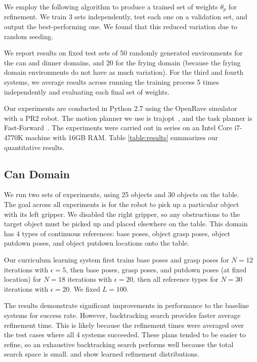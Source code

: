 We employ the following algorithm to produce a trained set of weights $\theta_{p}$ for refinement. We train 3 sets independently,
test each one on a validation set, and output the best-performing one. We found that this
reduced variation due to random seeding.

We report results on fixed test sets of 50 randomly generated environments for the can and dinner domains,
and 20 for the frying domain (because the frying domain environments do not have as much variation).
For the third and fourth systems, we average results across running the training
process 5 times independently and evaluating each final set of weights.

Our experiments are conducted in Python 2.7 using the OpenRave simulator~\cite{Diankov_2008_6117} with a PR2 robot.
The motion planner we use is trajopt~\cite{schulman2013finding}, and the task planner is Fast-Forward~\cite{FF}.
The experiments were carried out in series on an Intel Core i7-4770K machine with 16GB RAM.
Table \ref{table:results} summarizes our quantitative results.

\subsection{Can Domain}
We run two sets of experiments, using 25 objects and 30 objects on the table.
The goal across all experiments is for the robot to pick up a particular object with its
left gripper. We disabled the right gripper, so any obstructions to the target object must be picked up and
placed elsewhere on the table. This domain has 4 types of continuous references: base poses, object grasp
poses, object putdown poses, and object putdown locations onto the table.

Our curriculum learning system first trains base poses and grasp poses for $N = 12$ iterations with $\epsilon = 5$,
then base poses, grasp poses, and putdown poses (at fixed location) for $N = 18$ iterations with $\epsilon = 20$,
then all reference types for $N = 30$ iterations with $\epsilon = 20$. We fixed $L = 100$.

The results demonstrate significant improvements in performance to the baseline systems for success rate.
However, backtracking search provides faster average refinement time. This is likely because the
refinement times were averaged over the test cases where all 4 systems succeeded. These plans tended
to be easier to refine, so an exhaustive backtracking search performs well because the total search space is small.
 and  show learned refinement distributions.

